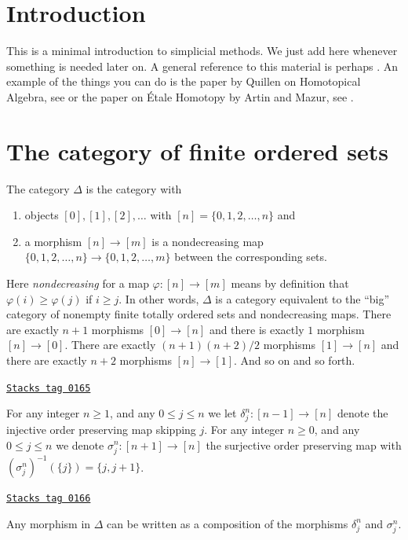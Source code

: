 \section{Introduction}
\label{simplicial-section-introduction}
This is a minimal introduction to simplicial methods.
We just add here whenever something is needed later on.
A general reference to this material is perhaps \cite{SimpHom}.
An example of the things you can do is the paper
by Quillen on Homotopical Algebra, see \cite{Quillen}
or the paper on \'Etale Homotopy by Artin and Mazur, see \cite{ArtinMazur}.

\section{The category of finite ordered sets}
\label{simplicial-section-Delta}
The category $\Delta$ is the category with
\begin{enumerate}
\item objects $[0], [1], [2], \ldots$ with
$[n] = \{0, 1, 2, \ldots, n\}$ and
\item a morphism $[n] \to [m]$ is a nondecreasing map
$\{0, 1, 2, \ldots, n\} \to \{0, 1, 2, \ldots, m\}$
between the corresponding sets.
\end{enumerate}
Here {\it nondecreasing} for a map $\varphi : [n] \to [m]$
means by definition that $\varphi(i) \geq \varphi(j)$ if $i \geq j$.
In other words, $\Delta$ is a category equivalent to the
``big'' category of nonempty finite totally ordered sets and nondecreasing maps.
There are exactly $n + 1$ morphisms $[0] \to [n]$ and
there is exactly $1$ morphism $[n] \to [0]$. There are
exactly $(n + 1)(n + 2)/2$ morphisms $[1] \to [n]$ and there are
exactly $n + 2$ morphisms $[n] \to [1]$. And so on and so forth.

\begin{definition}
\label{simplicial-definition-face-degeneracy}
\href{https://stacks.math.columbia.edu/tag/0165}{\texttt{Stacks tag 0165}}

For any integer $n\geq 1$, and any $0\leq j \leq n$ we let
{\it $\delta^n_j : [n-1] \to [n]$}
denote the injective order preserving map skipping $j$. For any
integer $n\geq 0$, and any $0\leq j \leq n$ we denote
{\it $\sigma^n_j : [n + 1]  \to [n]$}
the surjective order preserving map with
$(\sigma^n_j)^{-1}(\{j\}) = \{j, j + 1\}$.
\end{definition}

\begin{lemma}
\label{simplicial-lemma-face-degeneracy}
\href{https://stacks.math.columbia.edu/tag/0166}{\texttt{Stacks tag 0166}}

Any morphism in $\Delta$ can be written as a composition
of the morphisms $\delta^n_j$ and $\sigma^n_j$.
\end{lemma}

